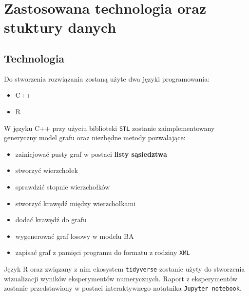 \documentclass{article}
\begin{document}
\section{Zastosowana technologia oraz stuktury danych \label{s5}}
\subsection{Technologia}
	Do stworzenia rozwiązania zostaną użyte dwa języki programowania:
		\begin{itemize}
			\item C++
			\item R
		\end{itemize}
		W języku C++ przy użyciu biblioteki \texttt{STL} zostanie zaimplementowany generyczny model grafu oraz niezbędne metody pozwalające: 
		\begin{itemize}
			\item zainicjować pusty graf w postaci \textbf{listy sąsiedztwa}
			\item stworzyć wierzchołek
			\item sprawdzić stopnie wierzchołków
			\item stworzyć krawędź między wierzchołkami
			\item dodać krawędź do grafu
			\item wygenerować graf losowy w modelu BA
			\item zapisać graf z pamięci programu do formatu z rodziny \texttt{XML}
		\end{itemize}
	Język R oraz związany z nim ekosystem \texttt{tidyverse} zostanie użyty do 
	stworzenia wizualizacji wyników eksperymentów numerycznych. Raport z eksperymentów zostanie
	przedstawiony w postaci interaktywnego notatnika \texttt{Jupyter notebook}.
\end{document}
